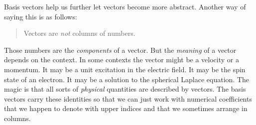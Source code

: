 Basis vectors help us further let vectors become more abstract.
%
Another way of saying this is as follows:
\begin{quote}
Vectors are \emph{not} columns of numbers.
\end{quote}
Those numbers are the \emph{components} of a vector. But the \emph{meaning} of a vector depends on the context. In some contexts the vector might be a velocity or a momentum. It may be a unit excitation in the electric field. It may be the spin state of an electron. It may be a solution to the spherical Laplace equation. The magic is that all sorts of \emph{physical} quantities are described by vectors. The basis vectors carry these identities so that we can just work with numerical coefficients that we happen to denote with upper indices and that we sometimes arrange in columns.


